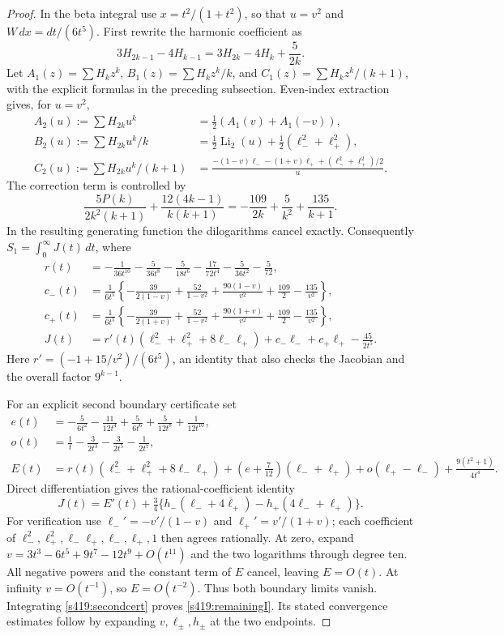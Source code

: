 \documentclass[11pt,a4paper]{article}
\theoremstyle{remark}\newtheorem{remark}[theorem]{Remark}
\newcommand{\Li}{\operatorname{Li}_2}
\numberwithin{equation}{section}
\begin{document}
\begin{proof}
In the beta integral use $x=t^2/(1+t^2)$, so that
$u=v^2$ and $W\,dx=dt/(6t^5)$. First rewrite the harmonic coefficient as
\[
 3H_{2k-1}-4H_{k-1}=3H_{2k}-4H_k+\frac5{2k}.
\]
Let $A_1(z)=\sum H_kz^k$, $B_1(z)=\sum H_kz^k/k$, and
$C_1(z)=\sum H_kz^k/(k+1)$, with the explicit formulas in the preceding subsection.
Even-index extraction gives, for $u=v^2$,
\begin{align*}
 A_2(u):=\sum H_{2k}u^k&=\tfrac12(A_1(v)+A_1(-v)),\\
 B_2(u):=\sum H_{2k}u^k/k&=\tfrac12\Li(u)+\tfrac12(\ell_-^2+\ell_+^2),\\
 C_2(u):=\sum H_{2k}u^k/(k+1)
 &=\frac{-(1-v)\ell_--(1+v)\ell_++(\ell_-^2+\ell_+^2)/2}{u}.
\end{align*}
The correction term is controlled by
\[
 \frac{5P(k)}{2k^2(k+1)}+\frac{12(4k-1)}{k(k+1)}
 =-\frac{109}{2k}+\frac5{k^2}+\frac{135}{k+1}.
\]
In the resulting generating function the dilogarithms cancel exactly.
Consequently $S_1=\int_0^\infty J(t)\,dt$, where
\begin{align*}
 r(t)&=-\frac1{36t^{10}}-\frac5{36t^8}-\frac5{18t^6}
       -\frac{17}{72t^4}-\frac5{36t^2}-\frac5{72},\\
 c_-(t)&=\frac1{6t^5}\left\{-\frac{39}{2(1-v)}+\frac{52}{1-v^2}
       +\frac{90(1-v)}{v^2}+\frac{109}2-\frac{135}{v^2}\right\},\\
 c_+(t)&=\frac1{6t^5}\left\{-\frac{39}{2(1+v)}+\frac{52}{1-v^2}
       +\frac{90(1+v)}{v^2}+\frac{109}2-\frac{135}{v^2}\right\},\\
 J(t)&=r'(t)(\ell_-^2+\ell_+^2+8\ell_-\ell_+)
           +c_-\ell_-+c_+\ell_+-\frac{45}{2t^5}.
\end{align*}
Here $r'=(-1+15/v^2)/(6t^5)$, an identity that also checks the Jacobian
and the overall factor $9^{k-1}$.

For an explicit second boundary certificate set
\begin{align*}
 e(t)&=-\frac5{6t^2}-\frac{11}{12t^4}+\frac5{6t^6}
          +\frac5{12t^8}+\frac1{12t^{10}},\\
 o(t)&=\frac1t-\frac3{2t^3}-\frac3{2t^5}-\frac1{2t^7},\\
 E(t)&=r(t)(\ell_-^2+\ell_+^2+8\ell_-\ell_+)
       +(e+\tfrac7{12})(\ell_-+\ell_+)+o(\ell_+-\ell_-)
       +\frac{9(t^2+1)}{4t^4}.
\end{align*}
Direct differentiation gives the rational-coefficient identity
\begin{equation}\label{s419:secondcert}
 J(t)=E'(t)+\tfrac34\{h_-(\ell_-+4\ell_+)-h_+(4\ell_-+\ell_+)\}.
\end{equation}
For verification use $\ell_-'=-v'/(1-v)$ and $\ell_+'=v'/(1+v)$;
each coefficient of $\ell_-^2,\ell_+^2,\ell_-\ell_+,\ell_-,\ell_+,1$
then agrees rationally. At zero, expand
$v=3t^3-6t^5+9t^7-12t^9+O(t^{11})$ and the two logarithms through
degree ten. All negative powers and the constant term of $E$ cancel,
leaving $E=O(t)$. At infinity $v=O(t^{-1})$, so $E=O(t^{-2})$.
Thus both boundary limits vanish. Integrating \eqref{s419:secondcert} proves
\eqref{s419:remainingI}. Its stated convergence estimates follow by expanding
$v,\ell_\pm,h_\pm$ at the two endpoints.
\end{proof}
\end{document}
